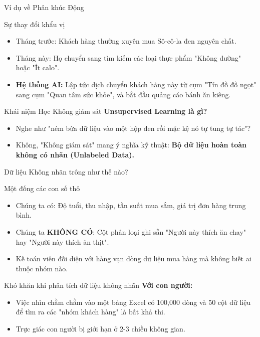 \documentclass[aspectratio=169]{beamer}
\begin{document}
\begin{frame}{Ví dụ về Phân khúc Động}
    \begin{block}{Sự thay đổi khẩu vị}
        \begin{itemize}
            \item Tháng trước: Khách hàng thường xuyên mua Sô-cô-la đen nguyên chất.
            \item Tháng này: Họ chuyển sang tìm kiếm các loại thực phẩm "Không đường" hoặc "Ít calo".
            \item \textbf{Hệ thống AI:} Lập tức dịch chuyển khách hàng này từ cụm "Tín đồ đồ ngọt" sang cụm "Quan tâm sức khỏe", và bắt đầu quảng cáo bánh ăn kiêng.
        \end{itemize}
    \end{block}
\end{frame}

\begin{frame}{Khái niệm Học Không giám sát}
    \textbf{Unsupervised Learning là gì?}
    \begin{itemize}
        \item Nghe như "ném bừa dữ liệu vào một hộp đen rồi mặc kệ nó tự tung tự tác"?
        \item Không, "Không giám sát" mang ý nghĩa kỹ thuật: \textbf{Bộ dữ liệu hoàn toàn không có nhãn (Unlabeled Data).}
    \end{itemize}
\end{frame}

\begin{frame}{Dữ liệu Không nhãn trông như thế nào?}
    \begin{block}{Một đống các con số thô}
        \begin{itemize}
            \item Chúng ta có: Độ tuổi, thu nhập, tần suất mua sắm, giá trị đơn hàng trung bình.
            \item Chúng ta \textbf{KHÔNG CÓ}: Cột phân loại ghi sẵn "Người này thích ăn chay" hay "Người này thích ăn thịt".
            \item Kế toán viên đối diện với hàng vạn dòng dữ liệu mua hàng mà không biết ai thuộc nhóm nào.
        \end{itemize}
    \end{block}
\end{frame}

\begin{frame}{Khó khăn khi phân tích dữ liệu không nhãn}
    \textbf{Với con người:}
    \begin{itemize}
        \item Việc nhìn chằm chằm vào một bảng Excel có 100,000 dòng và 50 cột dữ liệu để tìm ra các "nhóm khách hàng" là bất khả thi.
        \item Trực giác con người bị giới hạn ở 2-3 chiều không gian.
    \end{itemize}
\end{frame}
\end{document}
